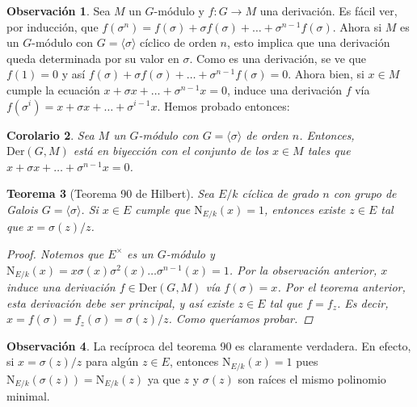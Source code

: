 \documentclass[12pt]{book}
\newtheorem{teo}{Teorema}[section]
\newtheorem{cor}[teo]{Corolario}
\theoremstyle{definition}
\newtheorem{obs}[teo]{Observación}
\begin{document}
\begin{obs}
Sea $M$ un $G$-módulo y $f:G\to M$ una derivación. Es fácil ver, por inducción, que $f(\sigma^n) = f(\sigma) + \sigma f(\sigma) + \ldots + \sigma^{n-1}f(\sigma)$. Ahora si $M$ es un $G$-módulo con $G = \langle\sigma\rangle$ cíclico de orden $n$, esto implica que una derivación queda determinada por su valor en $\sigma$. Como es una derivación, se ve que $f(1)=0$ y así $f(\sigma) + \sigma f(\sigma) + \ldots + \sigma^{n-1} f(\sigma) = 0$. Ahora bien, si $x\in M$ cumple la ecuación $x + \sigma x + \ldots + \sigma^{n-1} x =0$, induce una derivación $f$ vía $f(\sigma^i) = x + \sigma x + \ldots + \sigma^{i-1} x$. Hemos probado entonces:
\end{obs}

\begin{cor}
Sea $M$ un $G$-módulo con $G=\langle \sigma\rangle$ de orden $n$. Entonces, $\mathrm{Der}(G,M)$ está en biyección con el conjunto de los $x\in M$ tales que $x+\sigma x + \ldots + \sigma^{n-1}x = 0$.
\end{cor}

\begin{teo}[Teorema 90 de Hilbert]
Sea $E/k$ cíclica de grado $n$ con grupo de Galois $G=\langle\sigma\rangle$. Si $x\in E$ cumple que $\mathrm{N}_{E/k}(x)=1$, entonces existe $z\in E$ tal que $x=\sigma(z)/z$.
\begin{proof}
Notemos que $E^\times$ es un $G$-módulo y  $\mathrm{N}_{E/k}(x)=x\sigma(x)\sigma^2(x)\ldots \sigma^{n-1}(x)=1$. Por la observación anterior, $x$ induce una derivación $f\in\mathrm{Der}(G,M)$ vía $f(\sigma)=x$. Por el teorema anterior, esta derivación debe ser principal, y así existe $z\in E$ tal que $f=f_z$. Es decir, $x=f(\sigma) = f_z(\sigma) = \sigma(z)/z$. Como queríamos probar.
\end{proof}
\end{teo}

\begin{obs}
La recíproca del teorema 90 es claramente verdadera. En efecto, si $x=\sigma(z)/z$ para algún $z\in E$, entonces $\mathrm{N}_{E/k}(x)=1$ pues $\mathrm{N}_{E/k}(\sigma(z)) = \mathrm{N}_{E/k}(z)$ ya que $z$ y $\sigma(z)$ son raíces el mismo polinomio minimal.
\end{obs}
\end{document}
